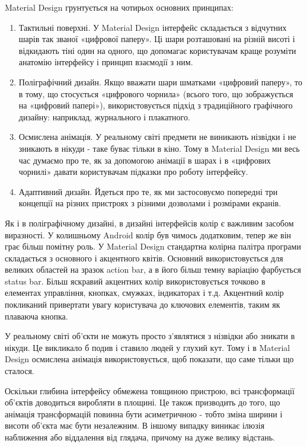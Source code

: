 \documentclass[../main.tex]{subfiles}
\begin{document}
Material Design грунтується на чотирьох основних принципах:
\begin{enumerate}
	\item Тактильні поверхні. У Material Design інтерфейс складається з відчутних шарів так званої «цифрової паперу». Ці шари розташовані на різній висоті і відкидають тіні один на одного, що допомагає користувачам краще розуміти анатомію інтерфейсу і принцип взаємодії з ним.
	\item Поліграфічний дизайн. Якщо вважати шари шматками «цифровий паперу», то в тому, що стосується «цифрового чорнила» (всього того, що зображується на «цифровий папері»), використовується підхід з традиційного графічного дизайну: наприклад, журнального і плакатного.
	\item Осмислена анімація. У реальному світі предмети не виникають нізвідки і не зникають в нікуди - таке буває тільки в кіно. Тому в Material Design ми весь час думаємо про те, як за допомогою анімації в шарах і в «цифрових чорнилі» давати користувачам підказки про роботу інтерфейсу.
	\item Адаптивний дизайн. Йдеться про те, як ми застосовуємо попередні три концепції на різних пристроях з різними дозволами і розмірами екранів.
\end{enumerate}

Як і в поліграфічному дизайні, в дизайні інтерфейсів колір є важливим засобом виразності. У колишньому Android колір був чимось додатковим, тепер же він грає більш помітну роль. У Material Design стандартна колірна палітра програми складається з основного і акцентного квітів. Основний використовується для великих областей на зразок action bar, а в його більш темну варіацію фарбується status bar. Більш яскравий акцентних колір використовується точково в елементах управління, кнопках, смужках, індикаторах і т.д. Акцентний колір покликаний привертати увагу користувача до ключових елементів, таким як плаваюча кнопка.

У реальному світі об'єкти не можуть просто з'являтися з нізвідки або зникати в нікуди. Це викликало б подив і ставило людей у глухий кут. Тому і в Material Design осмислена анімація використовується, щоб показати, що саме тільки що сталося.

Оскільки глибина інтерфейсу обмежена товщиною пристрою, всі трансформації об'єктів доводиться виробляти в площині. Це також призводить до того, що анімація трансформацій повинна бути асиметричною - тобто зміна ширини і висоти об'єкта має бути незалежним. В іншому випадку виникає ілюзія наближення або віддалення від глядача, причому на дуже велику відстань.
\end{document}
